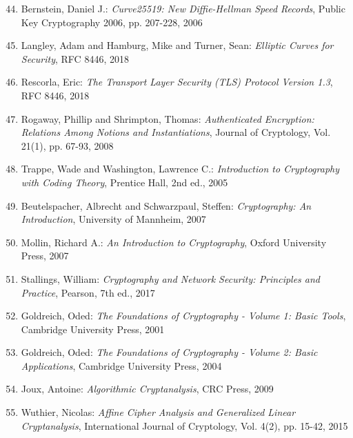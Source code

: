﻿\documentclass[12pt,a4paper]{article}
\begin{document}
	\begin{enumerate}
		\setcounter{enumi}{43}
		\item Bernstein, Daniel J.: \textit{Curve25519: New Diffie-Hellman Speed Records}, Public Key Cryptography 2006, pp. 207-228, 2006
		\item Langley, Adam and Hamburg, Mike and Turner, Sean: \textit{Elliptic Curves for Security}, RFC 8446, 2018
		\item Rescorla, Eric: \textit{The Transport Layer Security (TLS) Protocol Version 1.3}, RFC 8446, 2018
		\item Rogaway, Phillip and Shrimpton, Thomas: \textit{Authenticated Encryption: Relations Among Notions and Instantiations}, Journal of Cryptology, Vol. 21(1), pp. 67-93, 2008
	\end{enumerate}
	
	\begin{enumerate}
		\setcounter{enumi}{47}
		\item Trappe, Wade and Washington, Lawrence C.: \textit{Introduction to Cryptography with Coding Theory}, Prentice Hall, 2nd ed., 2005
		\item Beutelspacher, Albrecht and Schwarzpaul, Steffen: \textit{Cryptography: An Introduction}, University of Mannheim, 2007
		\item Mollin, Richard A.: \textit{An Introduction to Cryptography}, Oxford University Press, 2007
		\item Stallings, William: \textit{Cryptography and Network Security: Principles and Practice}, Pearson, 7th ed., 2017
	\end{enumerate}
	
	\begin{enumerate}
		\setcounter{enumi}{51}
		\item Goldreich, Oded: \textit{The Foundations of Cryptography - Volume 1: Basic Tools}, Cambridge University Press, 2001
		\item Goldreich, Oded: \textit{The Foundations of Cryptography - Volume 2: Basic Applications}, Cambridge University Press, 2004
		\item Joux, Antoine: \textit{Algorithmic Cryptanalysis}, CRC Press, 2009
		\item Wuthier, Nicolas: \textit{Affine Cipher Analysis and Generalized Linear Cryptanalysis}, International Journal of Cryptology, Vol. 4(2), pp. 15-42, 2015
	\end{enumerate}
	
	\appendix
	
\end{document}
